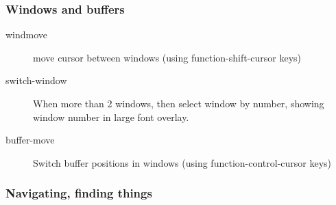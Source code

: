 \documentclass{article}
\begin{document}
\subsubsection{Windows and buffers}
\label{sec-1-1-2}

\begin{description}
\item[{windmove}] move cursor between windows (using function-shift-cursor keys)
\item[{switch-window}] When more than 2 windows, then select window by number, showing window number in large font overlay.
\item[{buffer-move}] Switch buffer positions in windows (using function-control-cursor keys)
\end{description}

\subsubsection{Navigating, finding things}
\label{sec-1-1-3}
\end{document}
